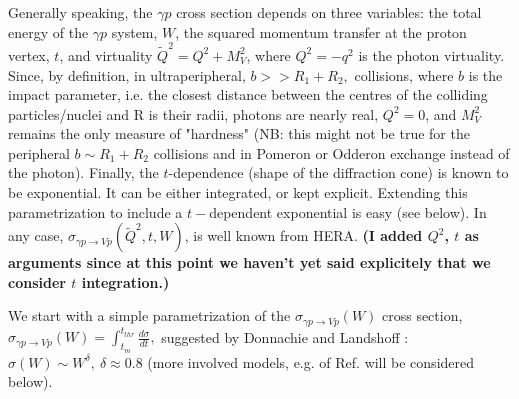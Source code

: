 \documentclass[12pt]{article}
\begin{document}
Generally speaking, the $\gamma p$ cross section depends on three variables: the total energy of the $\gamma p$ system, $W$,
the squared momentum transfer at the proton vertex, $t$, and virtuality $\tilde Q^2=Q^2+M_V^2$, where $Q^2=-q^2$ is the photon virtuality. Since, by definition, in ultraperipheral, $b>>R_1+R_2,$
collisions, where $b$ is the impact parameter, i.e. the closest distance between the centres of the colliding particles/nuclei and R is their radii,
photons are nearly real, $Q^2=0$, and $M_V^2$ remains the only measure of "hardness" (NB: this might not be true for the peripheral $b\sim R_1+R_2$ collisions and in
Pomeron or Odderon exchange instead of the photon). Finally, the $t$-dependence (shape of the diffraction cone) is known to be exponential. It can be either integrated, or 
kept explicit. Extending this parametrization to include a $t-$dependent exponential is easy (see below).
In any case, $\sigma_{\gamma p\rightarrow Vp}(\tilde Q^2, t, W)$, is well known from HERA.
{\tiny\bf (I added  $Q^2$, $t$ as arguments since at this point we haven't yet said explicitely that we consider $t$ integration.)}

We start with a simple parametrization of the $\sigma_{\gamma p\rightarrow Vp}(W)$ cross section, $\sigma_{\gamma p\rightarrow Vp}(W)=\int_{t_m}^{t_{thr}}\frac{d\sigma}{dt},$
suggested by Donnachie and Landshoff \cite{DL}: $\sigma(W)\sim W^{\delta},\ \delta\approx 0.8$ (more involved models, e.g. of Ref. \cite{Capua, Fazio}
will be considered below).
\end{document}
